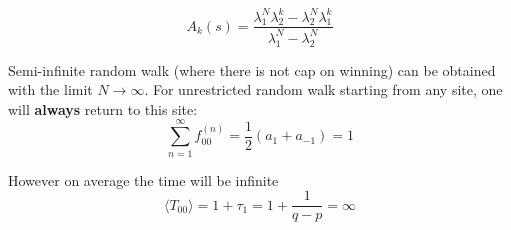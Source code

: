 \begin{equation*}
    A_k(s) = \frac{\lambda_1^N \lambda_2^k - \lambda_2^N \lambda_1^k}{\lambda_1^N - \lambda_2^N}
\end{equation*}

Semi-infinite random walk (where there is not cap on winning) can be obtained with the limit $N \rightarrow \infty$. For unrestricted random walk starting from any site, one will \textbf{always} return to this site:
\begin{equation*}
    \sum_{n=1}^{\infty} f_{00}^{(n)} = \frac{1}{2} (a_1 + a_{-1}) = 1
\end{equation*}

However on average the time will be infinite
\begin{equation*}
    \langle T_{00} \rangle = 1 + \tau_1 = 1 + \frac{1}{q-p} = \infty
\end{equation*}